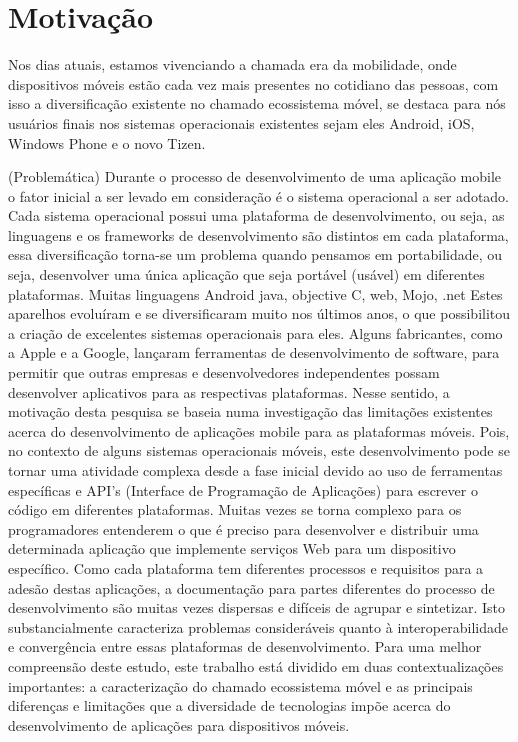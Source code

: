 \section{Motivação} %
\label{sec:motiva_o}

Nos dias atuais, estamos vivenciando a chamada era da mobilidade, onde
dispositivos móveis estão cada vez mais presentes no cotidiano das pessoas, com
isso a diversificação existente no chamado ecossistema móvel, se destaca para
nós usuários finais nos sistemas operacionais existentes sejam eles Android,
iOS, Windows Phone e o novo Tizen.

(Problemática) Durante o processo de desenvolvimento de uma aplicação mobile o
fator inicial a ser levado em consideração é o sistema operacional a ser adotado.
Cada sistema operacional possui uma plataforma de desenvolvimento, ou seja, as
linguagens e os frameworks de desenvolvimento são distintos em cada plataforma,
essa diversificação torna-se um problema quando pensamos em portabilidade,
ou seja, desenvolver uma única aplicação que seja portável (usável) em
diferentes plataformas.
Muitas linguagens Android java, objective C, web, Mojo, .net
Estes aparelhos evoluíram e se diversificaram muito nos últimos anos, o que possibilitou a criação de
excelentes sistemas operacionais para eles. Alguns fabricantes, como a Apple e a Google, lançaram
ferramentas de desenvolvimento de software, para permitir que outras empresas e desenvolvedores
independentes possam desenvolver aplicativos para as respectivas plataformas.
Nesse sentido, a motivação desta pesquisa se baseia numa investigação das limitações existentes
acerca do desenvolvimento de aplicações mobile para as plataformas móveis. Pois, no contexto de alguns
sistemas operacionais móveis, este desenvolvimento pode se tornar uma atividade complexa desde a fase
inicial devido ao uso de ferramentas específicas e API’s (Interface de Programação de Aplicações) para
escrever o código em diferentes plataformas. Muitas vezes se torna complexo para os programadores
entenderem o que é preciso para desenvolver e distribuir uma determinada aplicação que implemente
serviços Web para um dispositivo específico. Como cada plataforma tem diferentes processos e requisitos
para a adesão destas aplicações, a documentação para partes diferentes do processo de desenvolvimento são
muitas vezes dispersas e difíceis de agrupar e sintetizar. Isto substancialmente caracteriza problemas
consideráveis quanto à interoperabilidade e convergência entre essas plataformas de desenvolvimento. Para
uma melhor compreensão deste estudo, este trabalho está dividido em duas contextualizações importantes: a
caracterização do chamado ecossistema móvel e as principais diferenças e limitações que a diversidade de
tecnologias impõe acerca do desenvolvimento de aplicações para dispositivos móveis.

